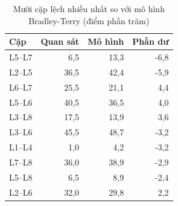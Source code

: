 \begin{table}[H]
  \centering
  \small
  \caption{Mười cặp lệch nhiều nhất so với mô hình Bradley-Terry (điểm phần trăm)}
  \label{tab:cs-tk-phandu}
  \begin{tabular}{lrrr}
    \toprule
    Cặp & Quan sát & Mô hình & Phần dư \\
    \midrule
    L5--L7 & 6,5 & 13,3 & -6,8 \\
    L2--L5 & 36,5 & 42,4 & -5,9 \\
    L6--L7 & 25,5 & 21,1 & 4,4 \\
    L5--L6 & 40,5 & 36,5 & 4,0 \\
    L3--L8 & 17,5 & 13,9 & 3,6 \\
    L3--L6 & 45,5 & 48,7 & -3,2 \\
    L1--L4 & 1,0 & 4,2 & -3,2 \\
    L7--L8 & 36,0 & 38,9 & -2,9 \\
    L5--L8 & 6,5 & 8,9 & -2,4 \\
    L2--L6 & 32,0 & 29,8 & 2,2 \\
    \bottomrule
  \end{tabular}
\end{table}
